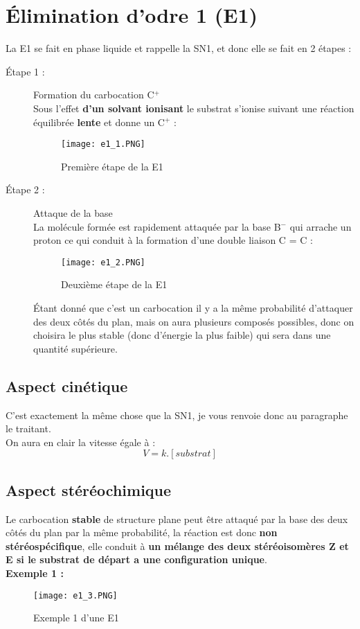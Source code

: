 \documentclass[a4paper, oneside]{book}
\begin{document}
\section{\'Elimination d'odre 1 (E1)}
La E1 se fait en phase liquide et rappelle la SN1, et donc elle se fait en 2 étapes :
\begin{description}
    \item[\'Etape 1 :] Formation du carbocation C$^+$\\
    Sous l'effet \textbf{d'un solvant ionisant} le substrat s'ionise suivant une réaction équilibrée \textbf{lente} et donne un C$^+$ :
    \begin{figure}[!h]
        \centering
        \texttt{[image: e1\_1.PNG]}
        \caption{Première étape de la E1}
        \label{fig:my_label}
    \end{figure}
    \newpage
    \item[\'Etape 2 :] Attaque de la base\\
    La molécule formée est rapidement attaquée par la base B$^-$ qui arrache un proton ce qui conduit à la formation d'une double liaison C = C :
    \begin{figure}[!h]
        \centering
        \texttt{[image: e1\_2.PNG]}
        \caption{Deuxième étape de la E1}
        \label{fig:my_label}
    \end{figure}
    
    \'Etant donné que c'est un carbocation il y a la même probabilité d'attaquer des deux côtés du plan, mais on aura plusieurs composés possibles, donc on choisira le plus stable (donc d'énergie la plus faible) qui sera dans une quantité supérieure.
\end{description}
\subsection{Aspect cinétique}
C'est exactement la même chose que la SN1, je vous renvoie donc au paragraphe le traitant.\\
On aura en clair la vitesse égale à :
\[
    V = k.[substrat]
\]
\subsection{Aspect stéréochimique}
Le carbocation \textbf{stable} de structure plane peut être attaqué par la base des deux côtés du plan par la même probabilité, la réaction est donc \textbf{non stéréospécifique}, elle conduit à \textbf{un mélange des deux stéréoisomères Z et E si le substrat de départ a une configuration unique}.\\
\textbf{Exemple 1 :}
\begin{figure}[!h]
    \centering
    \texttt{[image: e1\_3.PNG]}
    \caption{Exemple 1 d'une E1}
    \label{fig:my_label}
\end{figure}
\end{document}
